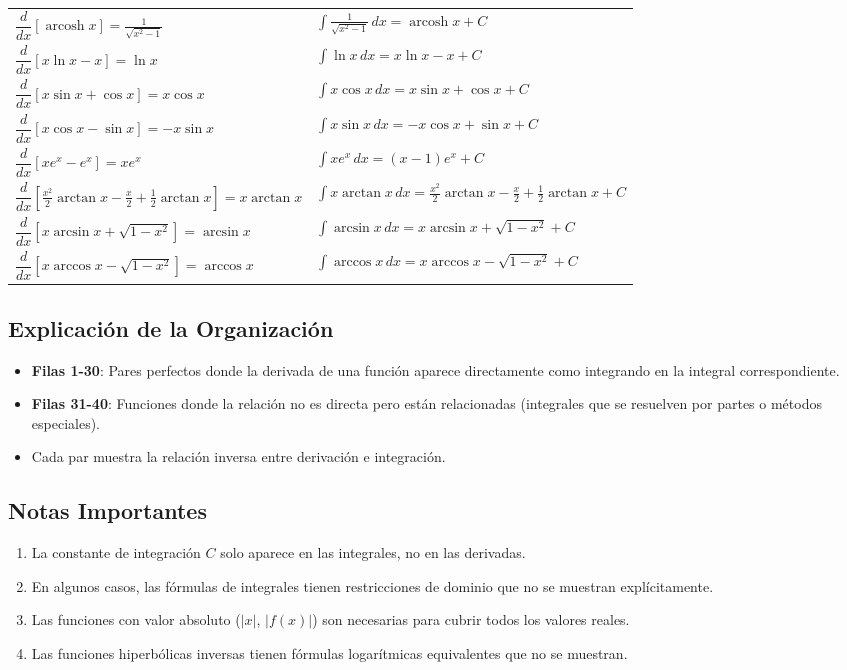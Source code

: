 \documentclass{article}
\begin{document}
\begin{center}
\begin{tabular}{|p{}|p{}|}
$\dfrac{d}{dx}[\operatorname{arcosh} x] = \frac{1}{\sqrt{x^2-1}}$ & $\displaystyle\int \frac{1}{\sqrt{x^2-1}} \, dx = \operatorname{arcosh} x + C$ \\
$\dfrac{d}{dx}[x\ln x - x] = \ln x$ & $\displaystyle\int \ln x \, dx = x\ln x - x + C$ \\
$\dfrac{d}{dx}[x\sin x + \cos x] = x\cos x$ & $\displaystyle\int x\cos x \, dx = x\sin x + \cos x + C$ \\
$\dfrac{d}{dx}[x\cos x - \sin x] = -x\sin x$ & $\displaystyle\int x\sin x \, dx = -x\cos x + \sin x + C$ \\
$\dfrac{d}{dx}[xe^x - e^x] = xe^x$ & $\displaystyle\int xe^x \, dx = (x-1)e^x + C$ \\
$\dfrac{d}{dx}\left[\frac{x^2}{2}\arctan x - \frac{x}{2} + \frac{1}{2}\arctan x\right] = x\arctan x$ & $\displaystyle\int x\arctan x \, dx = \frac{x^2}{2}\arctan x - \frac{x}{2} + \frac{1}{2}\arctan x + C$ \\
$\dfrac{d}{dx}[x\arcsin x + \sqrt{1-x^2}] = \arcsin x$ & $\displaystyle\int \arcsin x \, dx = x\arcsin x + \sqrt{1-x^2} + C$ \\
$\dfrac{d}{dx}[x\arccos x - \sqrt{1-x^2}] = \arccos x$ & $\displaystyle\int \arccos x \, dx = x\arccos x - \sqrt{1-x^2} + C$ \\
\bottomrule
\end{tabular}
\end{center}

\subsection*{Explicación de la Organización}
\begin{itemize}
\item \textbf{Filas 1-30}: Pares perfectos donde la derivada de una función aparece directamente como integrando en la integral correspondiente.
\item \textbf{Filas 31-40}: Funciones donde la relación no es directa pero están relacionadas (integrales que se resuelven por partes o métodos especiales).
\item Cada par muestra la relación inversa entre derivación e integración.
\end{itemize}

\subsection*{Notas Importantes}
\begin{enumerate}
\item La constante de integración $C$ solo aparece en las integrales, no en las derivadas.
\item En algunos casos, las fórmulas de integrales tienen restricciones de dominio que no se muestran explícitamente.
\item Las funciones con valor absoluto ($|x|$, $|f(x)|$) son necesarias para cubrir todos los valores reales.
\item Las funciones hiperbólicas inversas tienen fórmulas logarítmicas equivalentes que no se muestran.
\end{enumerate}
\end{document}
